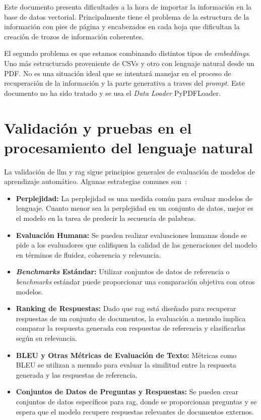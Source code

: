 Este documento presenta dificultades a la hora de importar la información en la base de datos vectorial. Principalmente tiene el problema de la estructura de la información con pies de página y encabezados en cada hoja que dificultan la creación de trozos de información coherentes. 

El segundo problema es que estamos combinando distintos tipos de \textit{embeddings}. Uno más estructurado proveniente de CSVs y otro con lenguaje natural desde un PDF. No es una situación ideal que se intentará manejar en el proceso de recuperación de la información y la parte generativa a traves del \textit{prompt}. Este documento no ha sido tratado y se usa el \textit{Data Loader} PyPDFLoader.

\section{Validación y pruebas en el procesamiento del lenguaje natural}

La validación de \acrshort{llm} y \acrshort{rag} sigue principios generales de evaluación de modelos de aprendizaje automático. Algunas estrategias comunes son~\cite{schäfer2023empirical}:

\begin{itemize}

\item \textbf{Perplejidad:} La perplejidad es una medida común para evaluar modelos de lenguaje. Cuanto menor sea la perplejidad en un conjunto de datos, mejor es el modelo en la tarea de predecir la secuencia de palabras.

\item \textbf{Evaluación Humana:} Se pueden realizar evaluaciones humanas donde se pide a los evaluadores que califiquen la calidad de las generaciones del modelo en términos de fluidez, coherencia y relevancia.

\item \textbf{\textit{Benchmarks} Estándar:} Utilizar conjuntos de datos de referencia o \textit{benchmarks} estándar puede proporcionar una comparación objetiva con otros modelos.

\item \textbf{Ranking de Respuestas:} Dado que \acrshort{rag} está diseñado para recuperar respuestas de un conjunto de documentos, la evaluación a menudo implica comparar la respuesta generada con respuestas de referencia y clasificarlas según su relevancia.

\item \textbf{BLEU y Otras Métricas de Evaluación de Texto:} Métricas como BLEU se utilizan a menudo para evaluar la similitud entre la respuesta generada y las respuestas de referencia.

\item \textbf{Conjuntos de Datos de Preguntas y Respuestas:} Se pueden crear conjuntos de datos específicos para \acrshort{rag}, donde se proporcionan preguntas y se espera que el modelo recupere respuestas relevantes de documentos externos.

\end{itemize}

